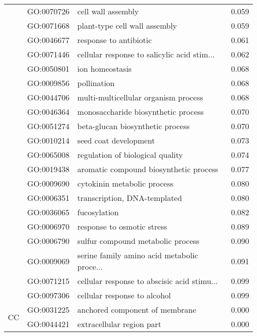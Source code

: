 \begin{longtable}{lllr}
   & GO:0070726 &                           cell wall assembly &         0.059 \\
   & GO:0071668 &                plant-type cell wall assembly &         0.059 \\
   & GO:0046677 &                       response to antibiotic &         0.061 \\
   & GO:0071446 &  cellular response to salicylic acid stim... &         0.062 \\
   & GO:0050801 &                              ion homeostasis &         0.068 \\
   & GO:0009856 &                                  pollination &         0.068 \\
   & GO:0044706 &         multi-multicellular organism process &         0.068 \\
   & GO:0046364 &          monosaccharide biosynthetic process &         0.070 \\
   & GO:0051274 &             beta-glucan biosynthetic process &         0.070 \\
   & GO:0010214 &                        seed coat development &         0.073 \\
   & GO:0065008 &             regulation of biological quality &         0.074 \\
   & GO:0019438 &       aromatic compound biosynthetic process &         0.077 \\
   & GO:0009690 &                  cytokinin metabolic process &         0.080 \\
   & GO:0006351 &                 transcription, DNA-templated &         0.080 \\
   & GO:0036065 &                                 fucosylation &         0.082 \\
   & GO:0006970 &                   response to osmotic stress &         0.089 \\
   & GO:0006790 &            sulfur compound metabolic process &         0.090 \\
   & GO:0009069 &  serine family amino acid metabolic proce... &         0.091 \\
   & GO:0071215 &  cellular response to abscisic acid stimu... &         0.099 \\
   & GO:0097306 &                 cellular response to alcohol &         0.099 \\
\cline{1-4}
\multirow{8}{*}{CC} & GO:0031225 &               anchored component of membrane &         0.000 \\
   & GO:0044421 &                    extracellular region part &         0.000 \\

\end{longtable}

